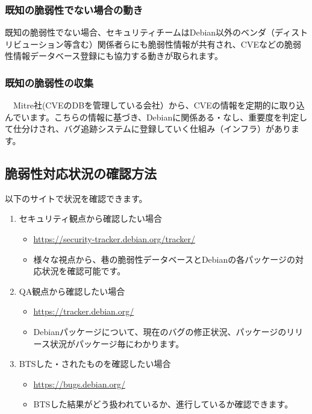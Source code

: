 \documentclass[mingoth,a4paper]{jsarticle}
\begin{document}
\subsubsection{既知の脆弱性でない場合の動き}

 既知の脆弱性でない場合、セキュリティチームはDebian以外のベンダ（ディストリビューション等含む）関係者らにも脆弱性情報が共有され、CVEなどの脆弱性情報データベース登録にも協力する動きが取られます。

\subsubsection{既知の脆弱性の収集}

　Mitre社(CVEのDBを管理している会社）から、CVEの情報を定期的に取り込んでいます。こちらの情報に基づき、Debianに関係ある・なし、重要度を判定して仕分けされ、バグ追跡システムに登録していく仕組み（インフラ）があります。

\subsection{脆弱性対応状況の確認方法}

 以下のサイトで状況を確認できます。

 \begin{enumerate}
\item セキュリティ観点から確認したい場合
  \begin{itemize}
  \item \url{https://security-tracker.debian.org/tracker/}
  \item 様々な視点から、巷の脆弱性データベースとDebianの各パッケージの対応状況を確認可能です。
  \end{itemize}
\item QA観点から確認したい場合
  \begin{itemize}
  \item \url{https://tracker.debian.org/}
    　\item Debianパッケージについて、現在のバグの修正状況、パッケージのリリース状況がパッケージ毎にわかります。
  \end{itemize}
\item BTSした・されたものを確認したい場合
  \begin{itemize}
  \item \url{https://bugs.debian.org/}
  \item BTSした結果がどう扱われているか、進行しているか確認できます。
  \end{itemize}  
\end{enumerate}
\end{document}
